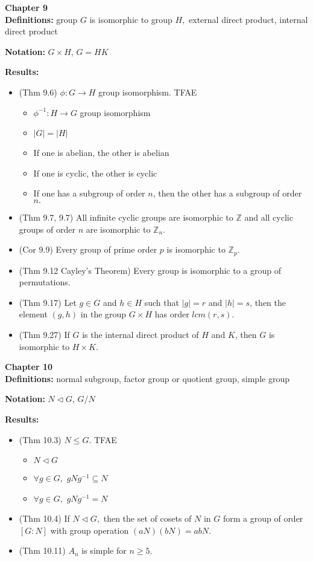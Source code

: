 \documentclass[12pt]{article}
\newcommand{\bbZ}{\mathbb{Z}}
\begin{document}
\noindent \textbf{Chapter 9}\\

\noindent \textbf{Definitions:} group $G$ is isomorphic to group $H,$ external direct product, internal direct product

\noindent \textbf{Notation:} $G \times H$, $G=HK$

\noindent \textbf{Results:}
	\begin{itemize}
	\item (Thm 9.6) $\phi: G \to H$ group isomorphism. TFAE
		\begin{itemize}
		\item $\phi^{-1}: H \to G$ group isomorphism
		\item $|G|=|H|$
		\item If one is abelian, the other is abelian
		\item If one is cyclic, the other is cyclic
		\item If one has a subgroup of order $n$, then the other has a subgroup of order $n.$
		\end{itemize}
	\item (Thm 9.7, 9.7) All infinite cyclic groups are isomorphic to $\bbZ$ and all cyclic groups of order $n$ are isomorphic to $\bbZ_n.$
	\item (Cor 9.9) Every group of prime order $p$ is isomorphic to $\bbZ_p.$
	\item (Thm 9.12 Cayley's Theorem) Every group is isomorphic to a group of permutations.
	\item (Thm 9.17) Let $g \in G$ and $h \in H$ such that $|g|=r$ and $|h|=s$, then the element $(g,h)$ in the group $G \times H$ has order $lcm(r,s).$
	\item (Thm 9.27) If $G$ is the internal direct product of $H$ and $K$, then $G$ is isomorphic to $H \times K.$
	\end{itemize}

\noindent \textbf{Chapter 10}\\

\noindent \textbf{Definitions:} normal subgroup, factor group or quotient group, simple group

\noindent \textbf{Notation:} $N \lhd G$, $G/N$

\noindent \textbf{Results:}
	\begin{itemize}
	\item (Thm 10.3) $N \leq G$. TFAE
		\begin{itemize}
		\item $N \lhd G$
		\item $\forall g \in G,$ $gNg^{-1} \subseteq N$
		\item $\forall g \in G,$ $gNg^{-1} = N$
		\end{itemize}
	\item (Thm 10.4) If $N \lhd G,$ then the set of cosets of $N$ in $G$ form a group of order $[G:N]$ with group operation $(aN)(bN)=abN.$
	\item (Thm 10.11) $A_n$ is simple for $n \geq 5.$
	\end{itemize}
\end{document}
